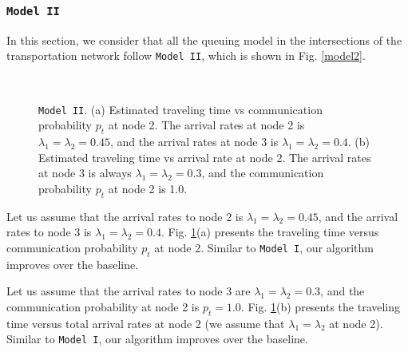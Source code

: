 \documentclass[conference]{IEEEtran}
\newcommand{\modelI}{{\tt{Model I}}}
\newcommand{\modelII}{{\tt{Model II}}}
\begin{document}
\subsubsection{\modelII}
In this section, we consider that all the queuing model in the intersections of the transportation network  follow \modelII, which is shown in Fig. \ref{model2}.

\begin{figure}[t!]
\begin{center}
 \\
\end{center}
\begin{center}
\vspace{-5pt}
\caption{\label{fig:sim_4nodes2paths_modelII} \modelII. (a) Estimated traveling time vs communication probability $p_t$ at node 2. The arrival rates at node 2 is $\lambda_1=\lambda_2=0.45$, and the arrival rates at node 3 is $\lambda_1=\lambda_2=0.4$. (b) Estimated traveling time vs arrival rate at node 2. The arrival rates at node 3 is always $\lambda_1=\lambda_2=0.3$, and the communication probability $p_t$ at node 2 is 1.0.}
\vspace{-25pt}
\end{center}
\end{figure}



Let us assume that the arrival rates to node 2 is $\lambda_1=\lambda_2=0.45$, and the arrival rates to node 3 is $\lambda_1=\lambda_2=0.4$. Fig. \ref{fig:sim_4nodes2paths_modelII}(a) presents the
traveling time versus communication probability $p_t$ at node 2. Similar to \modelI, our algorithm improves over the baseline.



Let us assume that the arrival rates to node 3 are $\lambda_1=\lambda_2=0.3$, and the communication probability at node 2 is $p_t=1.0$. Fig. \ref{fig:sim_4nodes2paths_modelII}(b) presents the traveling time versus total arrival rates at node 2 (we assume that $\lambda_1=\lambda_2$ at node 2). Similar to \modelI, our algorithm improves over the baseline. 

\vspace{-5pt}
\end{document}
